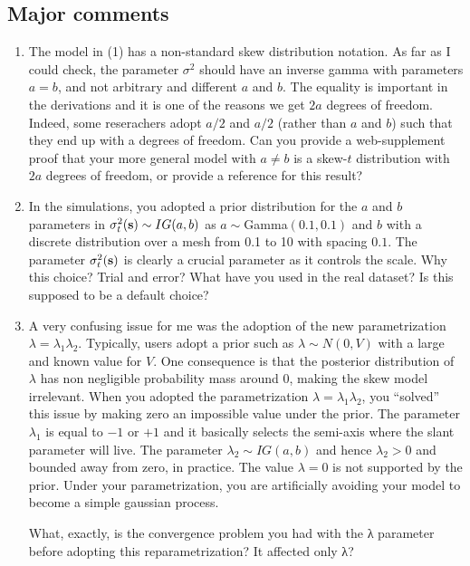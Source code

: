 \documentclass[11pt]{article}
\begin{document}
\subsection*{Major comments}
\begin{enumerate}[1.]
\item The model in (1) has a non-standard skew distribution notation. As far as I could check, the parameter $\sigma^2$ should have an inverse gamma with parameters $a = b$, and not arbitrary and different $a$ and $b$. The equality is important in the derivations and it is one of the reasons we get $2a$ degrees of freedom. Indeed, some reserachers adopt $a/2$ and $a/2$ (rather than $a$ and $b$) such that they end up with a degrees of freedom. Can you provide a web-supplement proof that your more general model with $a \neq b$ is a skew-$t$ distribution with $2a$ degrees of freedom, or provide a reference for this result?

\item In the simulations, you adopted a prior distribution for the $a$ and $b$ parameters in $\sigma_t^2 (\mbox{\bf s}) \sim IG(a, b)$ as $a \sim $Gamma$(0.1, 0.1)$ and $b$ with a discrete distribution over a mesh from 0.1 to 10 with spacing $0.1$. The parameter $\sigma_t^2(\mbox{\bf s})$ is clearly a crucial parameter as it controls the scale. Why this choice? Trial and error? What have you used in the real dataset? Is this supposed to be a default choice?

\item A very confusing issue for me was the adoption of the new parametrization $\lambda = \lambda_1 \lambda_2$. Typically, users adopt a prior such as $\lambda \sim N(0,V)$ with a large and known value for $V$. One consequence is that the posterior distribution of $\lambda$ has non negligible probability mass around 0, making the skew model irrelevant. When you adopted the parametrization $\lambda = \lambda_1 \lambda_2$, you ``solved'' this issue by making zero an impossible value under the prior. The parameter $\lambda_1$ is equal to $−1$ or $+1$ and it basically selects the semi-axis where the slant parameter will live. The parameter $\lambda_2 \sim IG(a, b)$ and hence $\lambda_2 > 0$ and bounded away from zero, in practice. The value $\lambda = 0$ is not supported by the prior. Under your parametrization, you are artificially avoiding your model to become a simple gaussian process.

What, exactly, is the convergence problem you had with the λ parameter before adopting this reparametrization?
It affected only λ?


\end{enumerate}
\end{document}
